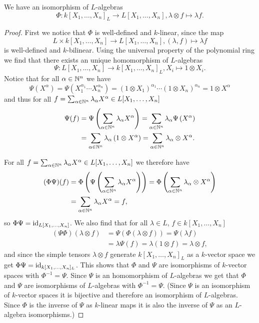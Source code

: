\begin{prop}
 We have an isomorphism of $L$-algebras
 \[
  \Phi \colon k[X_1, \dotsc, X_n]_L \to L[X_1, \dotsc, X_n], \lambda \otimes f \mapsto \lambda f.
 \]
\end{prop}
\begin{proof}
 First we notice that $\Phi$ is well-defined and $k$-linear, since the map
 \[
  L \times k[X_1, \dotsc, X_n] \to L[X_1, \dotsc, X_n], (\lambda,f) \mapsto \lambda f
 \]
 is well-defined and $k$-bilinear. Using the universal property of the polynomial ring we find that there exists an unique homomorphism of $L$-algebras
 \[
  \Psi \colon L[X_1, \dotsc, X_n] \to k[X_1, \dotsc, X_n]_L, X_i \mapsto 1 \otimes X_i.
 \]
 Notice that for all $\alpha \in \mathbb{N}^n$ we have
 \[
    \Psi\left( X^\alpha \right)
  = \Psi\left( X_1^{\alpha_1} \dotsm X_n^{\alpha_n} \right)
  = (1 \otimes X_1)^{\alpha_1} \dotsm (1 \otimes X_n)^{\alpha_n}
  = 1 \otimes X^\alpha
 \]
 and thus for all $f = \sum_{\alpha \in \mathbb{N}^n} \lambda_\alpha X^\alpha \in L[X_1, \dotsc, X_n]$
 \begin{align*}
     \Psi(f)
  &= \Psi\left( \sum_{\alpha \in \mathbb{N}^n} \lambda_\alpha X^\alpha \right)
   = \sum_{\alpha \in \mathbb{N}^n} \lambda_\alpha \Psi\left( X^\alpha \right) \\
  &= \sum_{\alpha \in \mathbb{N}^n} \lambda_\alpha \left( 1 \otimes X^\alpha \right)
   = \sum_{\alpha \in \mathbb{N}^n} \lambda_\alpha \otimes X^\alpha.
 \end{align*}

 For all $f = \sum_{\alpha \in \mathbb{N}^n} \lambda_\alpha X^\alpha \in L[X_1, \dotsc, X_n]$ we therefore have
 \begin{align*}
     (\Phi\Psi)(f)
  &= \Phi\left(\Psi\left( \sum_{\alpha \in \mathbb{N}^n} \lambda_\alpha X^\alpha \right)\right)
  = \Phi\left( \sum_{\alpha \in \mathbb{N}^n} \lambda_\alpha \otimes X^\alpha \right) \\
  &= \sum_{\alpha \in \mathbb{N}^n} \lambda_\alpha X^\alpha
  = f,
 \end{align*}
 so $\Phi \Psi = \operatorname{id}_{L[X_1, \dotsc, X_n]}$. We also find that for all $\lambda \in L$, $f \in k[X_1, \dotsc, X_n]$
 \begin{align*}
    (\Psi\Phi)(\lambda \otimes f)
  &= \Psi(\Phi(\lambda \otimes f))
  = \Psi(\lambda f) \\
  &= \lambda \Psi(f)
  = \lambda(1 \otimes f)
  = \lambda \otimes f,
 \end{align*}
 and since the simple tensors $\lambda \otimes f$ generate $k[X_1, \dotsc, X_n]_L$ as a $k$-vector space we get $\Phi \Psi = \operatorname{id}_{k[X_1, \dotsc, X_n]_L}$. This shows that $\Phi$ and $\Psi$ are isomorphisms of $k$-vector spaces with $\Phi^{-1} = \Psi$. Since $\Psi$ is an homomorphism of $L$-algebras we get that $\Phi$ and $\Psi$ are isomorphisms of $L$-algebras with $\Phi^{-1} = \Psi$. (Since $\Psi$ is an isomorphism of $k$-vector spaces it is bijective and therefore an isomorphism of $L$-algebras. Since $\Phi$ is the inverse of $\Psi$ as $k$-linear maps it is also the inverse of $\Psi$ as an $L$-algebra isomorphisms.)
\end{proof}




















